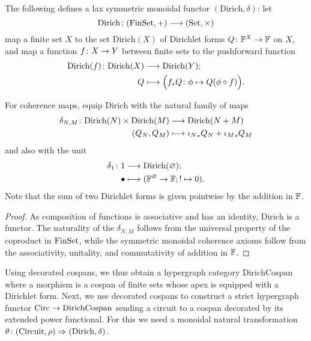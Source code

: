 \begin{proposition}
The following defines a lax symmetric monoidal functor
$(\mathrm{Dirich},\delta)$: let
\[
  \mathrm{Dirich}{\colon} (\mathrm{FinSet},+) \longrightarrow (\mathrm{Set},\times)
\]
map a finite set $X$ to the set $\mathrm{Dirich}(X)$ of Dirichlet forms
$Q{\colon} {\mathbb F}^X \to {\mathbb F}$ on $X$, and map a function $f{\colon} X \to Y$ between finite
sets to the pushforward function
\begin{align*}
  \mathrm{Dirich}(f){\colon} \mathrm{Dirich}(X) &\longrightarrow \mathrm{Dirich}(Y); \\
  Q &\longmapsto \Big(f_{\ast}Q{\colon} \phi \mapsto Q(\phi\circ f)\Big).
\end{align*}

For coherence maps, equip $\mathrm{Dirich}$ with the natural family of maps
\begin{align*}
  \delta_{N,M}{\colon} \mathrm{Dirich}(N) \times \mathrm{Dirich}(M) &\longrightarrow
  \mathrm{Dirich}(N+M) \\
  (Q_N,Q_M) &\longmapsto {\iota_N}_\ast Q_N+{\iota_M}_\ast Q_M
\end{align*}
and also with the unit
\begin{align*}
  \delta_1{\colon} 1 &\longrightarrow \mathrm{Dirich}(\varnothing);\\
  \bullet &\longmapsto ({\mathbb F}^\varnothing \to {\mathbb F}; ! \mapsto 0).
\end{align*}
Note that the sum of two Dirichlet forms is given pointwise by the addition in
${\mathbb F}$.
\end{proposition}
\begin{proof}
  As composition of functions is associative and has an identity,
  $\mathrm{Dirich}$ is a functor.  The naturality of the $\delta_{N,M}$ follows
  from the universal property of the coproduct in $\mathrm{FinSet}$, while the symmetric
  monoidal coherence axioms follow from the associativity, unitality, and
  commutativity of addition in ${\mathbb F}$.
\end{proof}


Using decorated cospans, we thus obtain a hypergraph category
$\mathrm{DirichCospan}$ where a morphism is a cospan of finite sets whose apex
is equipped with a Dirichlet form.  Next, we use decorated cospans to construct
a strict hypergraph functor $\mathrm{Circ} \to \mathrm{DirichCospan}$ sending a circuit
to a cospan decorated by its extended power functional. For this we need a
monoidal natural transformation $\theta{\colon} (\mathrm{Circuit},\rho) \Rightarrow
(\mathrm{Dirich},\delta)$.

